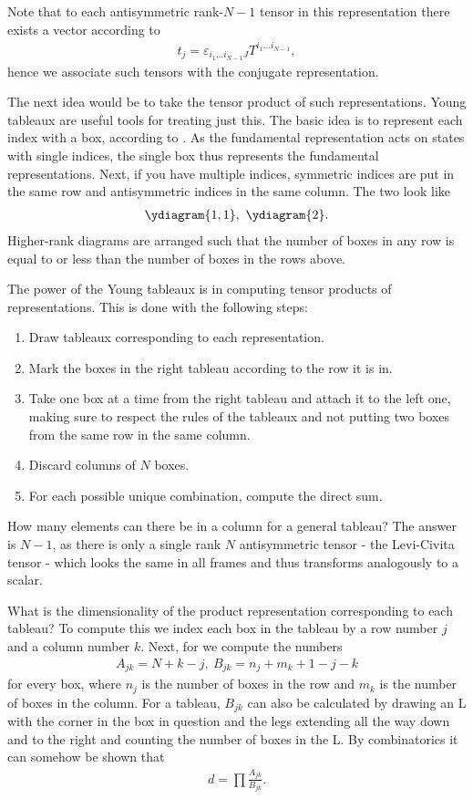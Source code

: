 Note that to each antisymmetric rank-$N - 1$ tensor in this representation there exists a vector according to
\begin{align*}
	t_{j} = \varepsilon_{i_{1}\dots i_{N - 1}J}T^{i_{1}\dots i_{N - 1}},
\end{align*}
hence we associate such tensors with the conjugate representation.

The next idea would be to take the tensor product of such representations. Young tableaux are useful tools for treating just this. The basic idea is to represent each index with a box, according to \ytableaushort{{}}. As the fundamental representation acts on states with single indices, the single box thus represents the fundamental representations. Next, if you have multiple indices, symmetric indices are put in the same row and antisymmetric indices in the same column. The two look like
\begin{align*}
	\ydiagram{1, 1},\ \ydiagram{2}.
\end{align*}
Higher-rank diagrams are arranged such that the number of boxes in any row is equal to or less than the number of boxes in the rows above.

The power of the Young tableaux is in computing tensor products of representations. This is done with the following steps:
\begin{enumerate}
	\item Draw tableaux corresponding to each representation.
	\item Mark the boxes in the right tableau according to the row it is in.
	\item Take one box at a time from the right tableau and attach it to the left one, making sure to respect the rules of the tableaux and not putting two boxes from the same row in the same column.
	\item Discard columns of $N$ boxes.
	\item For each possible unique combination, compute the direct sum.
\end{enumerate}

How many elements can there be in a column for a general  tableau? The answer is $N - 1$, as there is only a single rank $N$ antisymmetric tensor - the Levi-Civita tensor - which looks the same in all frames and thus transforms analogously to a scalar.

What is the dimensionality of the product representation corresponding to each tableau? To compute this we index each box in the tableau by a row number $j$ and a column number $k$. Next, for  we compute the numbers
\begin{align*}
	A_{jk} = N + k - j,\ B_{jk} = n_{j} + m_{k}  + 1 - j - k
\end{align*}
for every box, where $n_{j}$ is the number of boxes in the row and $m_{k}$ is the number of boxes in the column. For a tableau, $B_{jk}$ can also be calculated by drawing an L with the corner in the box in question and the legs extending all the way down and to the right and counting the number of boxes in the L. By combinatorics it can somehow be shown that
\begin{align*}
	d = \prod\frac{A_{jk}}{B_{jk}}.
\end{align*}

